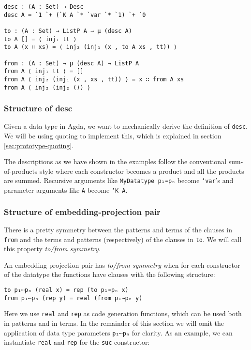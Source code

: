 \begin{verbatim}
desc : (A : Set) → Desc
desc A = `1 `+ (`K A `* `var `* `1) `+ `0

to : (A : Set) → ListP A → μ (desc A)
to A [] = ⟨ inj₁ tt ⟩
to A (x ∷ xs) = ⟨ inj₂ (inj₁ (x , to A xs , tt)) ⟩

from : (A : Set) → μ (desc A) → ListP A
from A ⟨ inj₁ tt ⟩ = []
from A ⟨ inj₂ (inj₁ (x , xs , tt)) ⟩ = x ∷ from A xs
from A ⟨ inj₂ (inj₂ ()) ⟩
\end{verbatim}

\subsubsection{Structure of desc}

Given a data type in Agda, we want to mechanically derive the
definition of \texttt{desc}.
We will be using quoting to implement this, which is explained in
section \ref{sec:prototype-quoting}.

The descriptions as we have shown in the examples follow the
conventional sum-of-products style where each constructor becomes a
product and all the products are summed.
Recursive arguments like \texttt{MyDatatype p₁⋯pₙ} become
\texttt{`var}'s and parameter arguments like \texttt{A} become
\texttt{`K A}.

\subsubsection{Structure of embedding-projection pair}

There is a pretty symmetry between the patterns and terms of the
clauses in \texttt{from} and the terms and patterns (respectively) of
the clauses in \texttt{to}.
We will call this property \emph{to/from symmetry}.

\begin{definition}
An embedding-projection pair has \emph{to/from symmetry} when for each
constructor of the datatype the functions have clauses with the
following structure:

\begin{verbatim}
to p₁⋯pₙ (real x) = rep (to p₁⋯pₙ x)
from p₁⋯pₙ (rep y) = real (from p₁⋯pₙ y)
\end{verbatim}
\end{definition}

Here we use \texttt{real} and \texttt{rep} as code generation
functions, which can be used both in patterns and in terms.
In the remainder of this section we will omit the application of data
type parameters \texttt{p₁⋯pₙ} for clarity.
As an example, we can instantiate \texttt{real} and \texttt{rep} for
the \texttt{suc} constructor:

